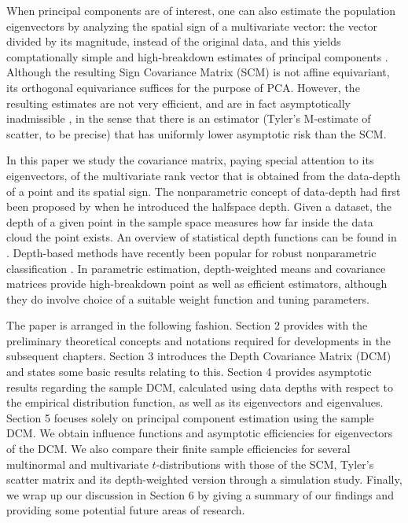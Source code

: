 \documentclass[fleqn,12pt]{article}
\begin{document}
When principal components are of interest, one can also estimate the population eigenvectors by analyzing the spatial sign of a multivariate vector: the vector divided by its magnitude, instead of the original data, and this yields comptationally simple and high-breakdown estimates of principal components \citep{locantore99, visuri00}. Although the resulting Sign Covariance Matrix (SCM) is not affine equivariant, its orthogonal equivariance suffices for the purpose of PCA. However, the resulting estimates are not very efficient, and are in fact asymptotically inadmissible \citep{magyar14}, in the sense that there is an estimator (Tyler's M-estimate of scatter, to be precise) that has uniformly lower asymptotic risk than the SCM.

In this paper we study the covariance matrix, paying special attention to its eigenvectors, of the multivariate rank vector that is obtained from the data-depth of a point and its spatial sign. The nonparametric concept of data-depth had first been proposed by \cite{tukey75} when he introduced the halfspace depth. Given a dataset, the depth of a given point in the sample space measures how far inside the data cloud the point exists. An overview of statistical depth functions can be found in \citep{zuo00}. Depth-based methods have recently been popular for robust nonparametric classification \citep{jornsten04, ghosh05, dutta12, sguera14}. In parametric estimation, depth-weighted means \citep{ZuoCuiHe04} and covariance matrices \citep{ZuoCui05} provide high-breakdown point as well as efficient estimators, although they do involve choice of a suitable weight function and tuning parameters.

The paper is arranged in the following fashion. Section 2 provides with the preliminary theoretical concepts and notations required for developments in the subsequent chapters. Section 3 introduces the Depth Covariance Matrix (DCM) and states some basic results relating to this. Section 4 provides asymptotic results regarding the sample DCM, calculated using data depths with respect to the empirical distribution function, as well as its eigenvectors and eigenvalues. Section 5 focuses solely on principal component estimation using the sample DCM. We obtain influence functions and asymptotic efficiencies for eigenvectors of the DCM. We also compare their finite sample efficiencies for several multinormal and multivariate $t$-distributions with those of the SCM, Tyler's scatter matrix and its depth-weighted version through a simulation study. Finally, we wrap up our discussion in Section 6 by giving a summary of our findings and providing some potential future areas of research.
\end{document}
